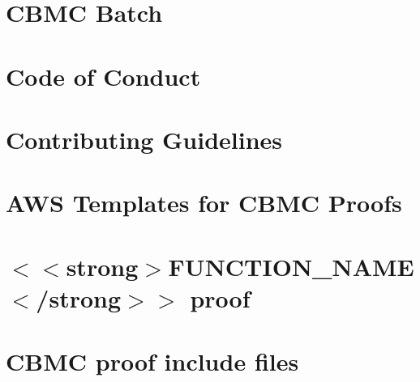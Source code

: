 \documentclass[twoside]{book}
\newcommand{\+}{\discretionary{\mbox{\scriptsize$\hookleftarrow$}}{}{}}
\begin{document}
\chapter{CBMC Batch}
\label{md_crt_aws_crt_cpp_crt_aws_c_common_verification_cbmc__r_e_a_d_m_e}

\chapter{Code of Conduct}
\label{md_crt_aws_crt_cpp_crt_aws_c_common_verification_cbmc_templates__c_o_d_e__o_f__c_o_n_d_u_c_t}

\chapter{Contributing Guidelines}
\label{md_crt_aws_crt_cpp_crt_aws_c_common_verification_cbmc_templates__c_o_n_t_r_i_b_u_t_i_n_g}

\chapter{AWS Templates for CBMC Proofs}
\label{md_crt_aws_crt_cpp_crt_aws_c_common_verification_cbmc_templates__r_e_a_d_m_e}

\chapter{\texorpdfstring{$<$}{<}\texorpdfstring{$<$}{<}strong\texorpdfstring{$>$}{>}FUNCTION\+\_\+\+NAME\texorpdfstring{$<$}{<}/strong\texorpdfstring{$>$}{>}\texorpdfstring{$>$}{>} proof}
\label{md_crt_aws_crt_cpp_crt_aws_c_common_verification_cbmc_templates_template_for_proof__r_e_a_d_m_e}

\chapter{CBMC proof include files}
\label{md_crt_aws_crt_cpp_crt_aws_c_common_verification_cbmc_templates_template_for_repository_include__r_e_a_d_m_e}

\end{document}
